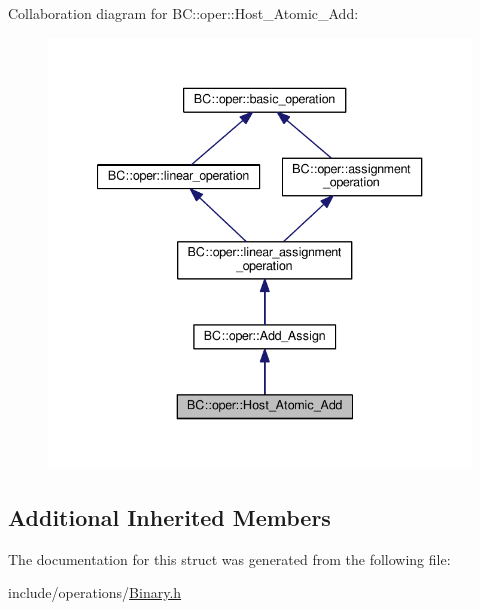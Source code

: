 Collaboration diagram for BC\+:\+:oper\+:\+:Host\+\_\+\+Atomic\+\_\+\+Add\+:
\nopagebreak
\begin{figure}[H]
\begin{center}
\leavevmode
\includegraphics[width=340pt]{structBC_1_1oper_1_1Host__Atomic__Add__coll__graph}
\end{center}
\end{figure}
\subsection*{Additional Inherited Members}


The documentation for this struct was generated from the following file\+:\begin{DoxyCompactItemize}
\item 
include/operations/\hyperlink{Binary_8h}{Binary.\+h}\end{DoxyCompactItemize}
